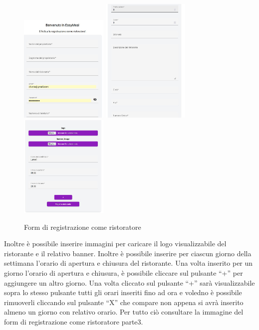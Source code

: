 \begin{figure}[htbp]
    \centering
    \includegraphics[width=0.375\textwidth]{./img/RegistrazioneRistoratore1.jpg}
    \hfill
    \includegraphics[width=0.375\textwidth]{./img/RegistrazioneRistoratore2.jpg}
    \hfill
    \includegraphics[width=0.375\textwidth]{./img/RegistrazioneRistoratore3.jpg}
    \caption{Form di registrazione come ristoratore}
\end{figure}

Inoltre è possibile inserire immagini per caricare il logo visualizzabile del ristorante e il relativo banner.
Inoltre è possibile inserire per ciascun giorno della settimana l'orario di apertura e chiusura del ristorante.
Una volta inserito per un giorno l'orario di apertura e chiusura, è possibile cliccare sul pulsante ``+'' per aggiungere un altro giorno.
Una volta cliccato sul pulsante ``+'' sarà visualizzabile sopra lo stesso pulsante tutti gli orari inseriti fino ad ora e voledno è possibile 
rimuoverli cliccando sul pulsante ``X'' che compare non appena si avrà inserito almeno un giorno con relativo orario.
Per tutto ciò consultare la immagine del form di registrazione come ristoratore parte3.



